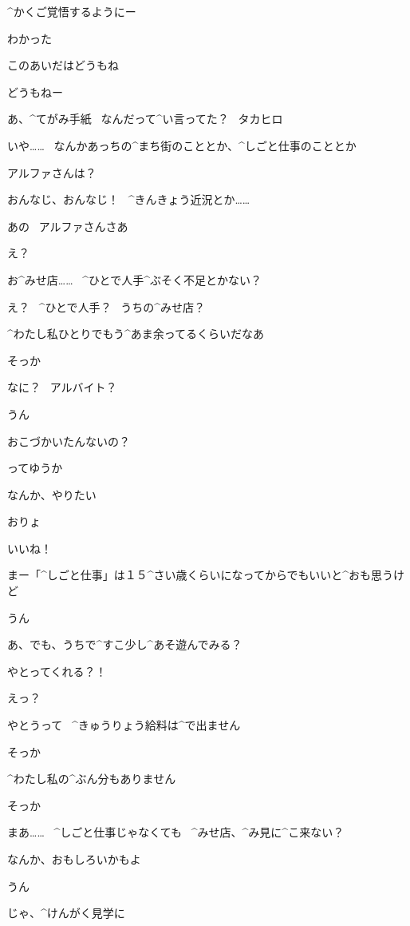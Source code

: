 \Alpha ^{かくご}{覚悟}するようにー

\Makki わかった

\page[71]
\Makki このあいだはどうもね

\Alpha どうもねー

\Alpha あ、^{てがみ}{手紙}
\ なんだって^{い}{言}ってた？
\ タカヒロ

\Makki いや……
\ なんかあっちの^{まち}{街}のこととか、^{しごと}{仕事}のこととか

\Makki アルファさんは？

\Alpha おんなじ、おんなじ！
\ ^{きんきょう}{近況}とか……

\page[72]
\Makki あの
\ アルファさんさあ

\Alpha え？

\Makki お^{みせ}{店}……
\ ^{ひとで}{人手}^{ぶそく}{不足}とかない？

\Alpha え？
\ ^{ひとで}{人手}？
\ うちの^{みせ}{店}？

\Alpha ^{わたし}{私}ひとりでもう^{あま}{余}ってるくらいだなあ

\Makki そっか

\page[73]
\Alpha なに？
\ アルバイト？

\Makki うん

\Alpha おこづかいたんないの？

\Makki ってゆうか

\Makki なんか、やりたい

\Alpha おりょ

\Alpha いいね！

\Alpha まー「^{しごと}{仕事}」は１５^{さい}{歳}くらいになってからでもいいと^{おも}{思}うけど

\page[74]
\Makki うん

\Alpha あ、でも、うちで^{すこ}{少}し^{あそ}{遊}んでみる？

\Makki やとってくれる？！

\Alpha えっ？

\Alpha やとうって
\ ^{きゅうりょう}{給料}は^{で}{出}ません

\Makki そっか

\Alpha ^{わたし}{私}の^{ぶん}{分}もありません

\Makki そっか

\page[75]
\Alpha まあ……
\ ^{しごと}{仕事}じゃなくても
\ ^{みせ}{店}、^{み}{見}に^{こ}{来}ない？

\Alpha なんか、おもしろいかもよ

\Makki うん

\Alpha じゃ、^{けんがく}{見学}に

